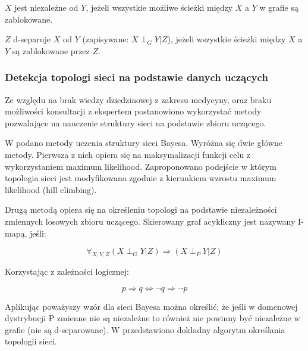 \documentclass{article}
\begin{document}
$X$ jest niezależne od $Y$, jeżeli wszystkie możliwe ścieżki między $X$ a $Y$ w grafie są zablokowane.

$Z$ d-separuje $X$ od $Y$ (zapisywane: $X \perp_G Y|Z$), jeżeli wszystkie ścieżki między $X$ a $Y$ są zablokowane przez $Z$.

\subsubsection{Detekcja topologi sieci na podstawie danych uczących}

Ze względu na brak wiedzy dziedzinowej z zakresu medycyny, oraz braku możliwości konsultacji z ekspertem postanowiono wykorzystać metody pozwalające na nauczenie struktury sieci na podstawie zbioru uczącego.

W \cite{PhD} podano metody uczenia struktury sieci Bayesa. Wyróżna się dwie główne metody. Pierwsza z nich opiera się na maksymalizacji funkcji celu z wykorzystaniem maximum likelihood. Zaproponowano podejście w którym topologia sieci jest modyfikowana zgodnie z kierunkiem wzrostu maximum likelihood (hill climbing).

Drugą metodą opiera się na określeniu topologi na podstawie niezależności zmiennych losowych zbioru uczącego. Skierowany graf acykliczny jest nazywany I-mapą, jeśli:

\begin{equation}
	\forall_{X, Y, Z} (X \perp_G Y| Z) 	\Rightarrow  (X \perp_P Y | Z)
\end{equation}

Korzystając z zależności logicznej:

\begin{equation}
	p \Rightarrow q \Leftrightarrow \neg q \Rightarrow \neg p
\end{equation}

Aplikując poważyszy wzór dla sieci Bayesa można określić, że jeśli w domenowej dystrybucji P zmienne nie są niezależne to również nie powinny być niezależne w grafie (nie są d-separowane). W \cite{PhD} przedstawiono dokładny algorytm określania topologii sieci.
\end{document}
